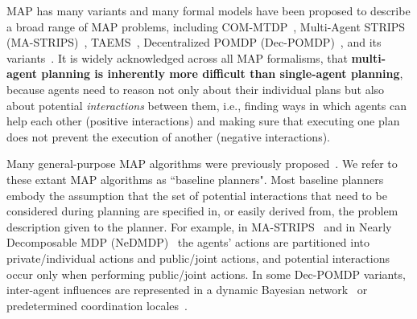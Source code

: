 \documentclass[11pt]{article}
\begin{document}







MAP has many variants and many formal models have been proposed to describe a broad range of MAP problems, including COM-MTDP~\cite{pynadath2002communicative}, Multi-Agent STRIPS (MA-STRIPS)~\cite{brafman2013complexity}, TAEMS~\cite{Horling-182,lesser2004evolution}, Decentralized POMDP (Dec-POMDP)~\cite{bernstein2002complexity}, and its variants~\cite{becker2004decentralized,roth2007exploiting,oliehoek2012influenceBased}. It is widely acknowledged across all MAP formalisms, that {\bf multi-agent planning is inherently more difficult than single-agent planning}, because agents need to reason not only about their individual plans but also about potential {\em interactions} between them, i.e., finding ways in which agents can help each other (positive interactions) and making sure that executing one plan does not prevent the execution of another (negative interactions).


Many general-purpose MAP algorithms were previously proposed~\cite{torreno2014fmap,nair2005networked,witwicki2010influence,spaan2011scaling,oliehoek2012influenceBased,wu2013monte,dibangoye2014exploiting,nissim2014distributed}. We refer to these extant MAP algorithms as ``baseline planners". 
Most baseline planners embody the assumption that the set of potential interactions that need to be considered during planning are specified in, or easily derived from, the problem description given to the planner. 
For example, in MA-STRIPS~\cite{brafman2013complexity} and in Nearly Decomposable MDP (NeDMDP)~\cite{kamar2013modeling} the agents' actions are partitioned into private/individual actions and public/joint actions, and potential interactions occur only when performing public/joint actions. In some Dec-POMDP variants, inter-agent influences are represented in a dynamic Bayesian network~\cite{nair2005networked,witwicki2010influence,oliehoek2012influenceBased} or predetermined coordination locales~\cite{varakantham2009exploiting}. 
\end{document}
